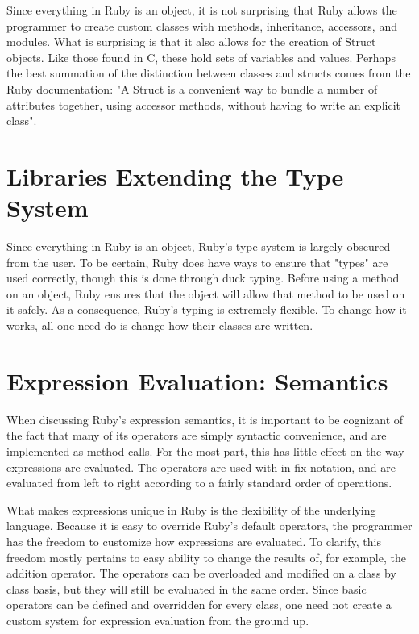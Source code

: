 \documentclass[12pt]{article}
\begin{document}
Since everything in Ruby is an object, it is not surprising that Ruby allows the programmer to create custom classes with methods, inheritance, accessors, and modules. What is surprising is that it also allows for the creation of Struct objects. Like those found in C, these hold sets of variables and values. Perhaps the best summation of the distinction between classes and structs comes from the Ruby documentation: "A Struct is a convenient way to bundle a number of attributes together, using accessor methods, without having to write an explicit class"\cite{docs_struct}.

\section{Libraries Extending the Type System}
Since everything in Ruby is an object, Ruby's type system is largely obscured from the user. To be certain, Ruby does have ways to ensure that "types" are used correctly, though this is done through duck typing. Before using a method on an object, Ruby ensures that the object will allow that method to be used on it safely. As a consequence, Ruby's typing is extremely flexible. To change how it works, all one need do is change how their classes are written.

\section{Expression Evaluation: Semantics}
When discussing Ruby's expression semantics, it is important to be cognizant of the fact that many of its operators are simply syntactic convenience, and are implemented as method calls\cite{opstut}. For the most part, this has little effect on the way expressions are evaluated. The operators are used with in-fix notation, and are evaluated from left to right according to a fairly standard order of operations.

What makes expressions unique in Ruby is the flexibility of the underlying language. Because it is easy to override Ruby's default operators, the programmer has the freedom to customize how expressions are evaluated\cite{generalrb}. To clarify, this freedom mostly pertains to easy ability to change the results of, for example, the addition operator. The operators can be overloaded and modified on a class by class basis, but they will still be evaluated in the same order. Since basic operators can be defined and overridden for every class, one need not create a custom system for expression evaluation from the ground up.
\end{document}
